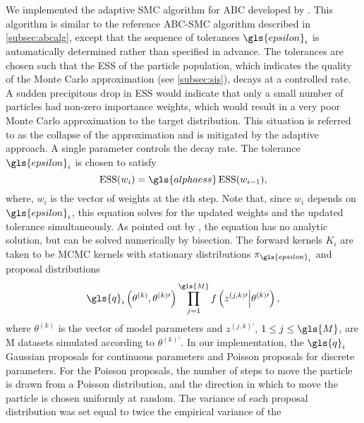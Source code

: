 We implemented the adaptive \gls{SMC} algorithm for \gls{ABC} developed by
\textcite{del2012adaptive}. This algorithm is similar to the reference
\gls{ABC}-\gls{SMC} algorithm described in \cref{subsec:abcalg}, except that
the sequence of tolerances $\gls{epsilon}_i$ is automatically determined rather
than specified in advance. The tolerances are chosen such that the \gls{ESS} of
the particle population, which indicates the quality of the Monte Carlo
approximation (see \cref{subsec:sis}), decays at a controlled rate. A
sudden precipitous drop in \gls{ESS} would indicate that only a small number of
particles had non-zero importance weights, which would result in a very poor
Monte Carlo approximation to the target distribution. This situation is
referred to as the collapse of the approximation  and is mitigated by the adaptive approach. A single
parameter 
controls the decay rate.  The tolerance $\gls{epsilon}_i$ is chosen to satisfy
\[
    \ESS(w_i) = \gls{alphaess} \ESS(w_{i-1}),
\]
where, $w_i$ is the vector of weights at the $i$th step. Note that, since $w_i$
depends on $\gls{epsilon}_i$, this equation solves for the updated weights and
the updated tolerance simultaneously. As pointed out by
\textcite{del2012adaptive}, the equation has no analytic solution, but can be
solved numerically by bisection. The forward kernels $K_i$ are taken to be
\gls{MCMC} kernels with stationary distributions $\pi_{\gls{epsilon}_i}$ and
proposal distributions
\[
    \gls{q}_i\left(\theta^{(k)}, \theta^{(k)\prime}\right) 
    \prod_{j=1}^{\gls{M}} \lik\left(z^{(j,k)\prime} \middle| \theta^{(k)\prime} \right),
\]
where $\theta^{(k)}$ is the vector of model parameters  and $z^{(j,k)\prime}$, $1 \leq j \leq \gls{M}$, are \gls{M}
datasets simulated according to $\theta^{(k)\prime}$. In our implementation,
the $\gls{q}_i$ 
Gaussian proposals for continuous parameters and Poisson proposals for discrete
parameters. For the Poisson proposals, the number of  steps to
move the particle is drawn from a Poisson distribution, and the direction in
which to move the particle is chosen uniformly at random. The variance of each
proposal distribution was set equal to twice the empirical variance of the

